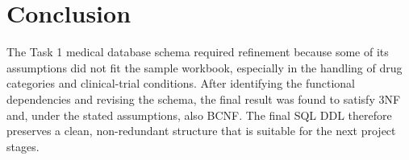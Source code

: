 \documentclass[12pt,a4paper]{article}
\begin{document}
\section{Conclusion}
The Task 1 medical database schema required refinement because some of its assumptions did not fit
the sample workbook, especially in the handling of drug categories and clinical-trial conditions.
After identifying the functional dependencies and revising the schema, the final result was found to
satisfy 3NF and, under the stated assumptions, also BCNF. The final SQL DDL therefore preserves a
clean, non-redundant structure that is suitable for the next project stages.
\end{document}
